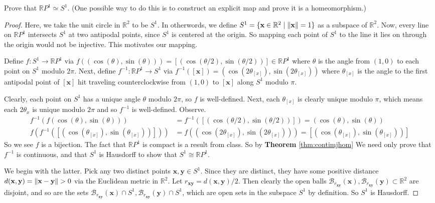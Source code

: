 \documentclass[addpoints,10pt]{exam}
\theoremstyle{plain}
\theoremstyle{definition}
\newtheorem{prob}[thm]{Problem}
\theoremstyle{plain}
\theoremstyle{plain}
\theoremstyle{definition}
\let\oldprob\prob
\let\endoldprob\endprob
\renewenvironment{prob}
  {\begin{singlespace}\oldprob}
  {\endoldprob\end{singlespace}}
\newcommand{\RR}{\ensuremath{\mathbb{R}}}
\newcommand{\BB}{\ensuremath{\mathcal{B}}}
\DeclarePairedDelimiter{\norm}{\lVert}{\rVert} %
\newcommand{\mbf}[1]{\ensuremath{\mathbf{#1}}}
\begin{document}
  \setcounter{thm}{0}
\newpage
\begin{prob}
Prove that $\mathbb{R}P^{1}\simeq S^{1}$. (One possible way to do this is to construct an explicit map and prove it is a homeomorphism.)

\end{prob}
  \begin{proof}
    Here, we take the unit circle in $\RR^{2}$ to be $S^{1}$. In otherwords, we define $S^{1}=\{\mbf{x}\in \RR^{2}\mid \norm{\mbf{x}}=1\}$ as a subspace of $\RR^{2}.$ Now, every line on $\RR P^{1}$ intersects $S^{1}$ at two antipodal points, since $S^{1}$ is centered at the origin. So mapping each point of $S^{1}$ to the line it lies on through the origin would not be injective. This motivates our mapping. 

      Define $f:S^{1}\to \RR P^{1}$ via $f((\cos(\theta), \sin(\theta)))= [(\cos(\theta/2), \sin(\theta/2))]\in \RR P^{1}$ where $\theta$ is the angle from $(1,0)$ to each point on $S^{1}$ modulo $2\pi$.  Next, define $f^{-1}:\RR P^{1}\to S^{1}$ via $f^{-1}([\mbf{x}])=(\cos(2\theta_{[x]}),\sin(2\theta_{[x]}))$ where $\theta_{[x]}$ is the angle to the first antipodal point of $[\mbf{x}]$ hit traveling counterclockwise from $(1,0)$ to $[\mbf{x}]$ along $S^{1}$ modulo $\pi$.

    Clearly, each point on $S^{1}$ has a unique angle $\theta$ modulo $2\pi$, so $f$ is well-defined. Next, each $\theta_{[x]}$ is clearly unique modulo $\pi$, which means each $2\theta_{x}$ is unique modulo $2\pi$ and so $f^{-1}$ is well-defined. Observe.
    \begin{align*}
      f^{-1}(f(\cos(\theta), \sin(\theta)))&=f^{-1}([(\cos(\theta/2), \sin(\theta/2))])=(\cos(\theta), \sin(\theta))\\
      f(f^{-1}([(\cos(\theta_{[x]}), \sin(\theta_{[x]}))]))&=f((\cos(2\theta_{[x]}), \sin(2\theta_{[x]})))=[(\cos(\theta_{[x]}), \sin(\theta_{[x]}))]
    \end{align*}
    So we see $f$ is a bijection. The fact that $\RR P^{1}$ is compact is a result from class. So by \textbf{Theorem }\ref{thm:contimjhom} We need only prove that $f^{-1}$ is continuous, and that $S^{1}$ is Hausdorff to show that $S^{1}\cong \RR P^{1}$.

    We begin with the latter. Pick any two distinct points $\mbf{x},\mbf{y}\in S^{1}.$ Since they are distinct, they have some positive distance $d(\mbf{x},\mbf{y})=\norm{\mbf{x}-\mbf{y}}>0$ via the Euclidean metric in $\RR^{2}.$ Let $r_{\mbf{x}\mbf{y}}=d(\mbf{x},\mbf{y})/2.$ Then clearly the open balls $\BB_{r_{\mbf{x}\mbf{y}}}(\mbf{x}),\BB_{r_{\mbf{x}\mbf{y}}}(\mbf{y})\subset \RR^{2}$ are disjoint, and so are the sets $\BB_{r_{\mbf{x}\mbf{y}}}(\mbf{x})\cap S^{1},\BB_{r_{\mbf{x}\mbf{y}}}(\mbf{y})\cap S^{1}$, which are open sets in the subspace $S^{1}$ by definition. So $S^{1}$ is Hausdorff.


\end{proof}
\end{document}
